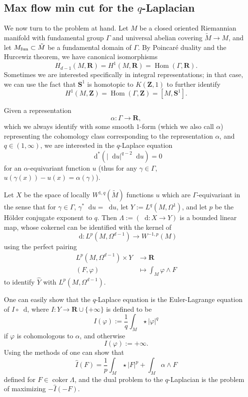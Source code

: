 \documentclass[reqno,11pt]{amsart}
\newcommand{\ZZ}{\mathbf{Z}}
\newcommand{\RR}{\mathbf{R}}
\newcommand{\Sph}{\mathbf S}
\newcommand*\dif{\mathop{}\!\mathrm{d}}
\DeclareMathOperator{\Hom}{Hom}
\DeclareMathOperator{\coker}{coker}
\theoremstyle{definition}
\numberwithin{equation}{section}
\begin{document}

\subsection{Max flow min cut for the \texorpdfstring{$q$-Laplacian}{q-Laplacian}}
We now turn to the problem at hand.
Let $M$ be a closed oriented Riemannian manifold with fundamental group $\Gamma$ and universal abelian covering $\tilde M \to M$, and let $M_{\rm fun} \subset \tilde M$ be a fundamental domain of $\Gamma$.
By Poincar\'e duality and the Hurcewiz theorem, we have canonical isomorphisms
\begin{equation}\label{Poincare Hurcewiz}
H_{d - 1}(M, \RR) = H^1(M, \RR) = \Hom(\Gamma, \RR).
\end{equation}
Sometimes we are interested specifically in integral representations; in that case, we can use the fact that $\Sph^1$ is homotopic to $K(\ZZ, 1)$ to further identify 
\begin{equation}\label{Poincare Hurcewiz 2}
H^1(M, \ZZ) = \Hom(\Gamma, \ZZ) = [M, \Sph^1].
\end{equation}

Given a representation
$$\alpha: \Gamma \to \RR,$$
which we always identify with some smooth $1$-form (which we also call $\alpha$) representing the cohomology class corresponding to the representation $\alpha$, and $q \in (1, \infty)$,
we are interested in the $q$-Laplace equation
$$\dif^* (|\dif u|^{q - 2} \dif u) = 0$$
for an $\alpha$-equivariant function $u$ (thus for any $\gamma \in \Gamma$, $u(\gamma(x)) - u(x) = \alpha(\gamma)$).

Let $X$ be the space of locally $W^{1, q}(\tilde M)$ functions $u$ which are $\Gamma$-equivariant in the sense that for $\gamma \in \Gamma$, $\gamma^* \dif u = \dif u$, let $Y := L^q(M, \Omega^1)$, and let $p$ be the H\"older conjugate exponent to $q$.
Then $\Lambda := (\dif: X \to Y)$ is a bounded linear map, whose cokernel can be identified with the kernel of
$$\dif: L^p(M, \Omega^{d - 1}) \to W^{-1, p}(M)$$
using the perfect pairing 
\begin{align*}
	L^p(M, \Omega^{d - 1}) \times Y &\to \RR \\
	(F, \varphi) &\mapsto \int_M \varphi \wedge F 
\end{align*}
to identify $\hat Y$ with $L^p(M, \Omega^{d - 1})$.

One can easily show that the $q$-Laplace equation is the Euler-Lagrange equation of $I \circ \dif$, where $I: Y \to \RR \cup \{+\infty\}$ is defined to be 
$$I(\varphi) := \frac{1}{q} \int_M \star |\varphi|^q$$
if $\varphi$ is cohomologous to $\alpha$, and otherwise 
$$I(\varphi) := +\infty.$$
Using the methods of \cite[Chapter I, \S4]{Ekeland99} one can show that
$$\hat I(F) = \frac{1}{p} \int_M \star |F|^p + \int_M \alpha \wedge F$$
defined for $F \in \coker \Lambda$, and the dual problem to the $q$-Laplacian is the problem of maximizing $-\hat I(-F)$.
\end{document}

